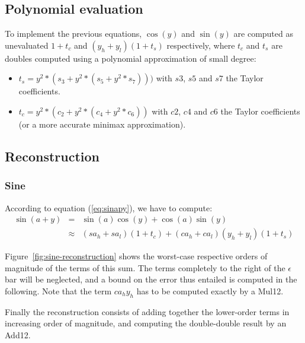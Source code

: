 \subsection{Polynomial evaluation}


To implement the previous equations, $\cos(y)$ and $\sin(y)$ are
computed as unevaluated $1+t_c$ and $(y_h+y_l)(1+t_s)$ respectively,
where $t_c$ and $t_s$ are doubles computed using a polynomial
approximation of small degree:

\begin{itemize}
\item $t_s = y^2*(s_3 + y^2*(s_5 + y^2*s_7)))$ with $s3$, $s5$ and
$s7$ the Taylor coefficients.
\item $t_c = y^2*(c_2 + y^2*(c_4 + y^2*c_6))$ with $c2$, $c4$ and $c6$ the
Taylor coefficients (or a more accurate minimax approximation).
\end{itemize}



\subsection{Reconstruction}

\subsubsection{Sine}
According to equation (\ref{eq:sinapy}), we have to compute: 
 \begin{eqnarray*}
  \sin(a+y) &=& \sin(a) \cos(y)  + \cos(a)\sin(y)  \\
  & \approx& (sa_h+sa_l)(1+t_c) + (ca_h+ca_l)(y_h+y_l)(1+t_s)
\end{eqnarray*}


Figure~\ref{fig:sine-reconstruction} shows the worst-case respective
orders of magnitude of the terms of this sum. The terms completely to the
right of the $\epsilon$ bar will be neglected, and a bound on the
error thus entailed is computed in the following. Note that the term
$ca_hy_h$ has to be computed exactly by a Mul12.

Finally the reconstruction consists of adding together the lower-order
terms in increasing order of magnitude, and computing the
double-double result by an Add12.

